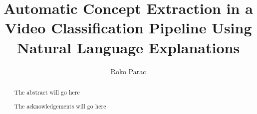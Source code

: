 \documentclass[a4paper, twoside, 12pt]{report}
\title{Automatic Concept Extraction in a Video Classification Pipeline Using Natural Language Explanations}
\author{Roko Parac}
\begin{document}


\begin{abstract}

The abstract will go here
\end{abstract}

\renewcommand{\abstractname}{Acknowledgements}
\begin{abstract}
The acknowledgements will go here
\end{abstract}

\tableofcontents
\listoffigures
\listoftables











%
%

%
%

\printbibliography
\end{document}
